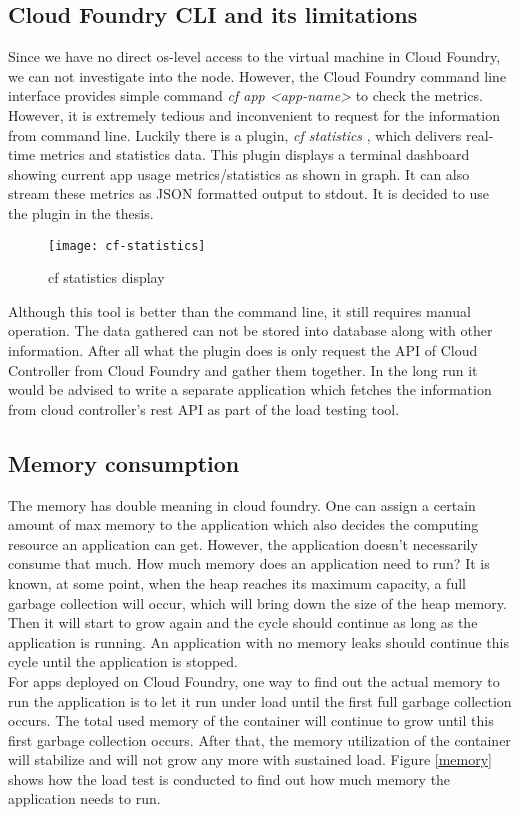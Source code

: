 \subsection{Cloud Foundry CLI and its limitations}
Since we have no direct os-level access to the virtual machine in Cloud Foundry, we can not investigate into the node. However, the Cloud Foundry command line interface provides simple command \textit{cf app <app-name>} to check the metrics. However, it is extremely tedious and inconvenient to request for the information from command line. Luckily there is a plugin, \textit{cf statistics} \citep{cfstatistics}, which delivers real-time metrics and statistics data. This plugin displays a terminal dashboard showing current app usage metrics/statistics as shown in graph. It can also stream these metrics as JSON formatted output to stdout. It is decided to use the plugin in the thesis. \\
\begin{figure}[h]
	\centering
	\texttt{[image: cf-statistics]}
	\caption{cf statistics display}
	\label{cf-statistics}
\end{figure}
Although this tool is better than the command line, it still requires manual operation. The data gathered can not be stored into database along with other information. After all what the plugin does is only request the API of Cloud Controller  \citep{cloudcontroller} from Cloud Foundry and gather them together. In the long run it would be advised to write a separate application which fetches the information from cloud controller's rest API as part of the load testing tool. 
\subsection{Memory consumption}
The memory has double meaning in cloud foundry. One can assign a certain amount of max memory to the application which also decides the computing resource an application can get. However, the application doesn't necessarily consume that much. How much memory does an application need to run? It is known, at some point, when the heap reaches its maximum capacity, a full garbage collection will occur, which will bring down the size of the heap memory. Then it will start to grow again and the cycle should continue as long as the application is running. An application with no memory leaks should continue this cycle until the application is stopped. \\
For apps deployed on Cloud Foundry, one way to find out the actual memory to run the application is to let it run under load until the first full garbage collection occurs. The total used memory of the container will continue to grow until this first garbage collection occurs. After that, the memory utilization of the container will stabilize and will not grow any more with sustained load. Figure \ref{memory} shows how the load test is conducted to find out how much memory the application needs to run. 

